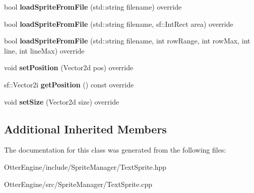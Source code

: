 \begin{DoxyCompactItemize}
\item 
bool {\bfseries load\+Sprite\+From\+File} (std\+::string filename) override\hypertarget{class_otter_engine_1_1_text_sprite_a9b7cc96cd6dbe1faf31e07d4e641e4e4}{}\label{class_otter_engine_1_1_text_sprite_a9b7cc96cd6dbe1faf31e07d4e641e4e4}

\item 
bool {\bfseries load\+Sprite\+From\+File} (std\+::string filename, sf\+::\+Int\+Rect area) override\hypertarget{class_otter_engine_1_1_text_sprite_a2748cb2188ebcc7bfe1db82651b93bd7}{}\label{class_otter_engine_1_1_text_sprite_a2748cb2188ebcc7bfe1db82651b93bd7}

\item 
bool {\bfseries load\+Sprite\+From\+File} (std\+::string filename, int row\+Range, int row\+Max, int line, int line\+Max) override\hypertarget{class_otter_engine_1_1_text_sprite_a548a01eb67aa0731716d45117248169e}{}\label{class_otter_engine_1_1_text_sprite_a548a01eb67aa0731716d45117248169e}

\item 
void {\bfseries set\+Position} (Vector2d pos) override\hypertarget{class_otter_engine_1_1_text_sprite_aff6112180835dcaa4785901a99c955f4}{}\label{class_otter_engine_1_1_text_sprite_aff6112180835dcaa4785901a99c955f4}

\item 
sf\+::\+Vector2i {\bfseries get\+Position} () const override\hypertarget{class_otter_engine_1_1_text_sprite_acfd883c06030238163fb382c1f6a14b6}{}\label{class_otter_engine_1_1_text_sprite_acfd883c06030238163fb382c1f6a14b6}

\item 
void {\bfseries set\+Size} (Vector2d size) override\hypertarget{class_otter_engine_1_1_text_sprite_a6a4412dcb03296269954f774bfa9e02c}{}\label{class_otter_engine_1_1_text_sprite_a6a4412dcb03296269954f774bfa9e02c}

\end{DoxyCompactItemize}
\subsection*{Additional Inherited Members}


The documentation for this class was generated from the following files\+:\begin{DoxyCompactItemize}
\item 
Otter\+Engine/include/\+Sprite\+Manager/Text\+Sprite.\+hpp\item 
Otter\+Engine/src/\+Sprite\+Manager/Text\+Sprite.\+cpp\end{DoxyCompactItemize}
